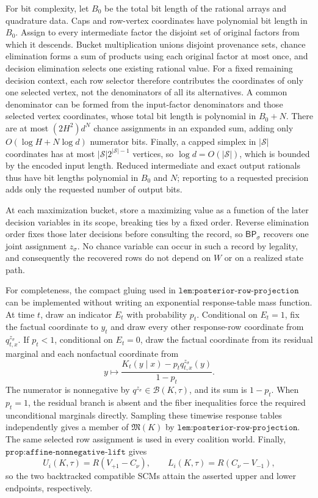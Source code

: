 For bit complexity, let \(B_0\) be the total bit length of the rational arrays and quadrature data.  Caps and row-vertex coordinates have polynomial bit length in \(B_0\).  Assign to every intermediate factor the disjoint set of original factors from which it descends.  Bucket multiplication unions disjoint provenance sets, chance elimination forms a sum of products using each original factor at most once, and decision elimination selects one existing rational value.  For a fixed remaining decision context, each row selector therefore contributes the coordinates of only one selected vertex, not the denominators of all its alternatives.  A common denominator can be formed from the input-factor denominators and those selected vertex coordinates, whose total bit length is polynomial in \(B_0+N\).  There are at most \((2H^2)d^N\) chance assignments in an expanded sum, adding only \(O(\log H+N\log d)\) numerator bits.  Finally, a capped simplex in \(|\mathcal S|\) coordinates has at most \(|\mathcal S|2^{|\mathcal S|-1}\) vertices, so \(\log d=O(|\mathcal S|)\), which is bounded by the encoded input length.  Reduced intermediate and exact output rationals thus have bit lengths polynomial in \(B_0\) and \(N\); reporting to a requested precision adds only the requested number of output bits.

At each maximization bucket, store a maximizing value as a function of the later decision variables in its scope, breaking ties by a fixed order.  Reverse elimination order fixes those later decisions before consulting the record, so \(\mathsf{BP}_\sigma\) recovers one joint assignment \(z_\sigma\).  No chance variable can occur in such a record by legality, and consequently the recovered rows do not depend on \(W\) or on a realized state path.

For completeness, the compact gluing used in \(\texttt{lem:posterior-row-projection}\) can be implemented without writing an exponential response-table mass function.  At time \(t\), draw an indicator \(E_t\) with probability \(p_t\).  Conditional on \(E_t=1\), fix the factual coordinate to \(y_t\) and draw every other response-row coordinate from \(q^{z_\sigma}_{t,x}\).  If \(p_t<1\), conditional on \(E_t=0\), draw the factual coordinate from its residual marginal and each nonfactual coordinate from
\[
 y\longmapsto
 \frac{K_t(y\mid x)-p_tq^{z_\sigma}_{t,x}(y)}{1-p_t}.
\]
The numerator is nonnegative by \(q^{z_\sigma}\in\mathcal B(K,\tau)\), and its sum is \(1-p_t\).  When \(p_t=1\), the residual branch is absent and the fiber inequalities force the required unconditional marginals directly.  Sampling these timewise response tables independently gives a member of \(\mathfrak M(K)\) by \(\texttt{lem:posterior-row-projection}\).  The same selected row assignment is used in every coalition world.  Finally, \(\texttt{prop:affine-nonnegative-lift}\) gives
\[
 U_i(K,\tau)=R(V_{+1}-C_\nu),
 \qquad
 L_i(K,\tau)=R(C_\nu-V_{-1}),
\]
so the two backtracked compatible SCMs attain the asserted upper and lower endpoints, respectively.